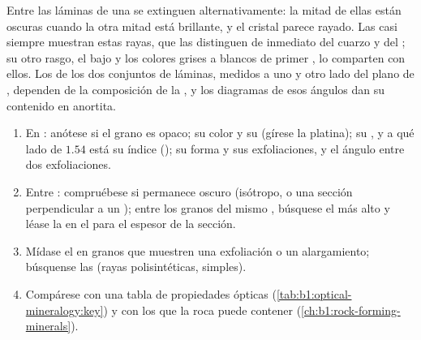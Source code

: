 Entre  las láminas de una  se extinguen alternativamente: la mitad de ellas están oscuras
cuando la otra mitad está brillante, y el cristal parece rayado. Las  casi siempre muestran estas rayas, que las
distinguen de inmediato del cuarzo y del ; su otro rasgo, el  bajo y los colores grises a blancos de
primer , lo comparten con ellos. Los  de los dos conjuntos de láminas, medidos a uno y otro lado del
plano de , dependen de la composición de la , y los diagramas de esos ángulos dan su contenido en anortita.

\begin{method}\label{met:b1:optical-mineralogy:identify}
\begin{enumerate}
  \item En : anótese si el grano es opaco; su color y su  (gírese la platina); su , y a
        qué lado de $1.54$ está su índice (); su forma y sus exfoliaciones, y el ángulo entre dos exfoliaciones.
  \item Entre : compruébese si permanece oscuro (isótropo, o una sección perpendicular a un );
        entre los granos del mismo , búsquese el  más alto y léase la  en el  para el espesor de la sección.
  \item Mídase el  en granos que muestren una exfoliación o un alargamiento; búsquense las  (rayas
        polisintéticas,  simples).
  \item Compárese con una tabla de propiedades ópticas (\cref{tab:b1:optical-mineralogy:key}) y con los  que la roca
        puede contener (\cref{ch:b1:rock-forming-minerals}).
\end{enumerate}
\end{method}

